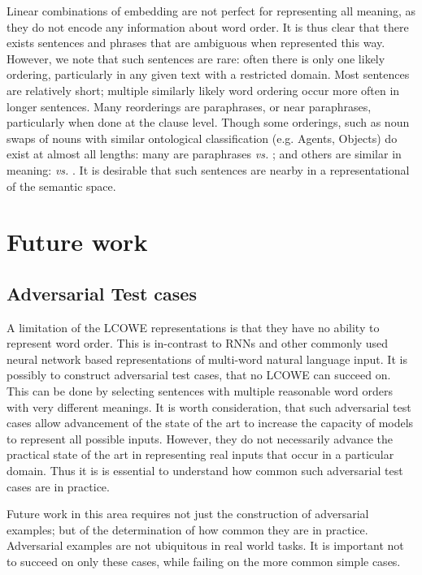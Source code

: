 \documentclass{book}
\begin{document}
Linear combinations of embedding are not perfect for representing all meaning,
as they do not encode any information about word order.
It is thus clear that there exists sentences and phrases that are ambiguous when represented this way.
However, we note that such sentences are rare: often there is only one likely ordering, particularly in any given text with a restricted domain.
Most sentences are relatively short; multiple similarly likely word ordering occur more often in longer sentences.
Many reorderings are paraphrases, or near paraphrases, particularly when done at the clause level.
Though some orderings, such as noun swaps of nouns with similar ontological classification (e.g. Agents, Objects) do exist at almost all lengths:
many are paraphrases  \emph{vs.} ;
and others are similar in meaning:  \emph{vs.} .
It is desirable that such sentences are nearby in a representational of the semantic space.


\section{Future work}

\subsection{Adversarial Test cases}
A limitation of the LCOWE representations is that they have no ability to represent word order.
This is in-contrast to RNNs and other commonly used neural network based representations of multi-word natural language input.
It is possibly to construct adversarial test cases, that no LCOWE can succeed on.
This can be done by selecting sentences with multiple reasonable word orders with very different meanings.
It is worth consideration,
that such adversarial test cases allow advancement of the state of the art to increase the capacity of models to represent all possible inputs.
However, they do not necessarily advance the practical state of the art in representing real inputs that occur in a particular domain. 
Thus it is  is essential to understand how common such adversarial test cases are in practice.

Future work in this area requires not just the construction of adversarial examples; but of the determination of how common they are in practice.
Adversarial examples are not ubiquitous in real world tasks.
It is important not to succeed on only these cases, while failing on the more common simple cases.
\end{document}
